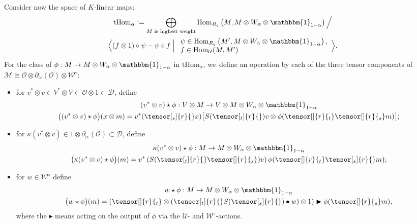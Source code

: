 \documentclass[JEP,XML,SOM,Unicode,published]{cedram}
\theoremstyle{definition}
\newcommand{\Hom}{\mathrm{Hom}}
\newcommand{\OO}{\mathcal{O}}
\newcommand{\UU}{\mathcal{U}}
\newcommand{\DD}{\mathcal{D}}
\newcommand{\WW}{\mathcal{W}}
\newcommand{\WWo}{\WW^\circ}
\newcommand{\MM}{\mathcal{M}}
\begin{document}
Consider now the space of $K$-linear maps:
\begin{multline}
\mathrm{tHom}_\alpha:=\bigoplus_{M\text{ is highest weight}}\Hom_{R_q}\left(M, M\otimes W_{\alpha}\otimes\mathbbm{1}_{1-\alpha}\right)\Big/\\
\Bigl\langle
(f\otimes 1)\circ \psi -\psi \circ f\Bigm|
\begin{array}{l}
\psi\in\Hom_{R_q}\left(M', M\otimes W_{\alpha}\otimes\mathbbm{1}_{1-\alpha}\right),\\
f\in\Hom_\UU(M,M')
\end{array}
\Bigr\rangle.
\label{tHomLinRel}
\end{multline}
For the class of $\phi:M\to M\otimes W_{\alpha}\otimes\mathbbm{1}_{1-\alpha}$ in $\mathrm{tHom}_\alpha$, we~define an operation by each of the three tensor components of $\MM\cong\OO\otimes\partial_{\triangleright}(\OO)\otimes \WWo$:
\begin{itemize}
\item for $v^*\otimes v\in V^*\otimes V\subset\OO\otimes1\subset\DD$, define
\begin{equation}
\begin{gathered}
(v^*\otimes v)\star\phi:V\otimes M\to V\otimes M\otimes W_{\alpha}\otimes\mathbbm{1}_{1-\alpha}\\
\big((v^*\otimes v)\star\phi\big)(x\otimes m)=v^*(\tensor[_s]{r}{}x)\bigl[S(\tensor[_t]{r}{})v\otimes\phi(\tensor[]{r}{_t}\tensor[]{r}{_s}m)\bigr];
\end{gathered}
\label{tHomActA}
\end{equation}
\item for $\kappa(v^*\otimes v)\in 1\otimes\partial_{\triangleright}(\OO)\subset\DD$, define
\begin{equation}
\begin{gathered}
\kappa(v^*\otimes v)\star\phi:M\to M\otimes W_{\alpha}\otimes\mathbbm{1}_{1-\alpha}\\
\big(\kappa(v^*\otimes v)\star\phi\big)(m)=v^*\left(S(\tensor[_t]{r}{}\tensor[]{r}{_s})v\right)\phi(\tensor[]{r}{_t}\tensor[_s]{r}{}m);
\end{gathered}
\label{tHomActB}
\end{equation}
\item for $w\in \WWo$ define
\begin{equation}
\begin{gathered}
w\star\phi:M\to M\otimes W_{\alpha}\otimes\mathbbm{1}_{1-\alpha}\\
\big(w\star\phi\big)(m)=\left(\tensor[]{r}{_t}\otimes (\tensor[_t]{r}{}S(\tensor[_s]{r}{})\bullet w) \otimes 1\right)\blacktriangleright\phi(\tensor[]{r}{_s}m),
\end{gathered}
\label{tHomActW}
\end{equation}
where the $\blacktriangleright$ means acting on the output of $\phi$ via the $\UU$- and $\WWo$-actions.
\end{itemize}
\end{document}
